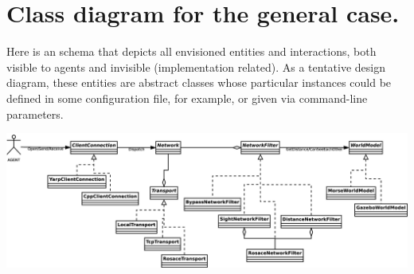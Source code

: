 \documentclass[a4paper,11pt]{article}
\begin{document}
\section{Class diagram for the general case.}

Here is an schema that depicts all envisioned entities and interactions, both visible to agents and invisible (implementation related). As a tentative design diagram, these entities are abstract classes whose particular instances could be defined in some configuration file, for example, or given via command-line parameters.

\begin{center}
\includegraphics[width=0.999\columnwidth]{figures/classes}
\end{center}
\end{document}
